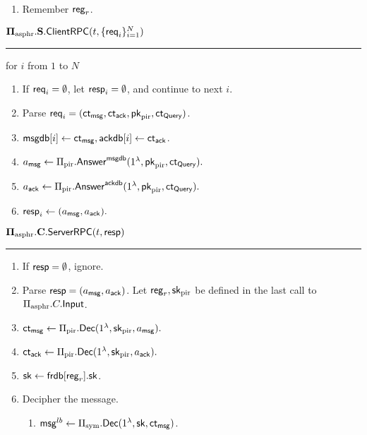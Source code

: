 \begin{definition}
\begin{enumerate}
    \item Remember $\mathsf{reg}_r$.
\end{enumerate}
\vspace{10pt}
$\mathbf{\Pi_{\text{asphr}}.S.\mathsf{ClientRPC}}(t, \{\mathsf{req}_i\}_{i = 1}^N)$
\vspace{5pt}
\hrule
\vspace{5pt}
\item for $i$ from $1$ to $N$
\begin{enumerate}
    \item If $\mathsf{req}_i = \emptyset$, let $\mathsf{resp}_i = \emptyset$, and continue to next $i$. 
    \item Parse $\mathsf{req}_i = (\mathsf{ct}_{\mathsf{msg}}, \mathsf{ct}_{\mathsf{ack}}, \mathsf{pk}_{\text{pir}}, \mathsf{ct}_{\mathsf{Query}})$.
    \item $\mathsf{msgdb}[i] \leftarrow \mathsf{ct}_{\mathsf{msg}}, \mathsf{ackdb}[i] \leftarrow \mathsf{ct}_{\mathsf{ack}}$.
    \item $a_{\mathsf{msg}} \leftarrow \Pi_{\text{pir}}.\mathsf{Answer}^{\mathsf{msgdb}}(1^{\lambda}, \mathsf{pk}_{\text{pir}}, \mathsf{ct}_{\mathsf{Query}}).$
    \item $a_{\mathsf{ack}} \leftarrow \Pi_{\text{pir}}.\mathsf{Answer}^{\mathsf{ackdb}}(1^{\lambda}, \mathsf{pk}_{\text{pir}}, \mathsf{ct}_{\mathsf{Query}}).$
    \item $\mathsf{resp}_i \leftarrow (a_{\mathsf{msg}}, a_{\mathsf{ack}}).$
\end{enumerate}
\vspace{10pt}
$\mathbf{\Pi_{\text{asphr}}.C.\mathsf{ServerRPC}}(t, \mathsf{resp})$
\vspace{5pt}
\hrule
\vspace{5pt}
\begin{enumerate}
    \item If $\mathsf{resp} = \emptyset$, ignore.
    \item Parse $\mathsf{resp} = (a_{\mathsf{msg}}, a_{\mathsf{ack}})$. Let $\mathsf{reg}_r, {\mathsf{sk}}_{\text{pir}}$ be defined in the last call to $\Pi_{\text{asphr}}.C.\mathsf{Input}$.
    \item $\mathsf{ct}_{\mathsf{msg}} \leftarrow \Pi_{\text{pir}}.\mathsf{Dec}(1^{\lambda}, {\mathsf{sk}}_{\text{pir}}, a_{\mathsf{msg}}).$
    \item $\mathsf{ct}_{\mathsf{ack}} \leftarrow \Pi_{\text{pir}}.\mathsf{Dec}(1^{\lambda}, {\mathsf{sk}}_{\text{pir}}, a_{\mathsf{ack}}).$
    \item ${\mathsf{sk}} \leftarrow \mathsf{frdb}[\mathsf{reg}_r].{\mathsf{sk}}$.
    \item Decipher the message.
    \begin{enumerate}
        \item $\mathsf{msg}^{lb} \leftarrow \Pi_{\text{sym}}.\mathsf{Dec}(1^{\lambda}, {\mathsf{sk}}, \mathsf{ct}_{\mathsf{msg}})$.

\end{enumerate}
\end{enumerate}
\end{definition}
